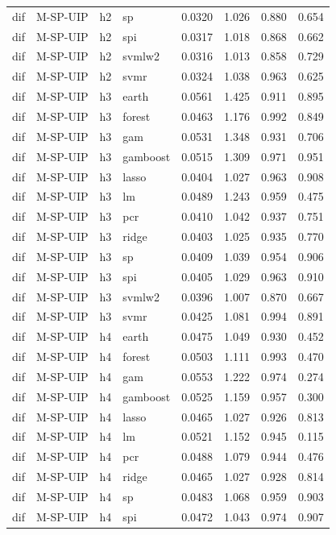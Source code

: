 \begin{ThreePartTable}
\begin{longtable}[t]{llclcccc}
dif & M-SP-UIP & h2 & sp & 0.0320 & 1.026 & 0.880 & 0.654\\
dif & M-SP-UIP & h2 & spi & 0.0317 & 1.018 & 0.868 & 0.662\\
dif & M-SP-UIP & h2 & svmlw2 & 0.0316 & 1.013 & 0.858 & 0.729\\
dif & M-SP-UIP & h2 & svmr & 0.0324 & 1.038 & 0.963 & 0.625\\
\addlinespace
dif & M-SP-UIP & h3 & earth & 0.0561 & 1.425 & 0.911 & 0.895\\
dif & M-SP-UIP & h3 & forest & 0.0463 & 1.176 & 0.992 & 0.849\\
dif & M-SP-UIP & h3 & gam & 0.0531 & 1.348 & 0.931 & 0.706\\
dif & M-SP-UIP & h3 & gamboost & 0.0515 & 1.309 & 0.971 & 0.951\\
dif & M-SP-UIP & h3 & lasso & 0.0404 & 1.027 & 0.963 & 0.908\\
dif & M-SP-UIP & h3 & lm & 0.0489 & 1.243 & 0.959 & 0.475\\
dif & M-SP-UIP & h3 & pcr & 0.0410 & 1.042 & 0.937 & 0.751\\
dif & M-SP-UIP & h3 & ridge & 0.0403 & 1.025 & 0.935 & 0.770\\
dif & M-SP-UIP & h3 & sp & 0.0409 & 1.039 & 0.954 & 0.906\\
dif & M-SP-UIP & h3 & spi & 0.0405 & 1.029 & 0.963 & 0.910\\
dif & M-SP-UIP & h3 & svmlw2 & 0.0396 & 1.007 & 0.870 & 0.667\\
dif & M-SP-UIP & h3 & svmr & 0.0425 & 1.081 & 0.994 & 0.891\\
\addlinespace
dif & M-SP-UIP & h4 & earth & 0.0475 & 1.049 & 0.930 & 0.452\\
dif & M-SP-UIP & h4 & forest & 0.0503 & 1.111 & 0.993 & 0.470\\
dif & M-SP-UIP & h4 & gam & 0.0553 & 1.222 & 0.974 & 0.274\\
dif & M-SP-UIP & h4 & gamboost & 0.0525 & 1.159 & 0.957 & 0.300\\
dif & M-SP-UIP & h4 & lasso & 0.0465 & 1.027 & 0.926 & 0.813\\
dif & M-SP-UIP & h4 & lm & 0.0521 & 1.152 & 0.945 & 0.115\\
dif & M-SP-UIP & h4 & pcr & 0.0488 & 1.079 & 0.944 & 0.476\\
dif & M-SP-UIP & h4 & ridge & 0.0465 & 1.027 & 0.928 & 0.814\\
dif & M-SP-UIP & h4 & sp & 0.0483 & 1.068 & 0.959 & 0.903\\
dif & M-SP-UIP & h4 & spi & 0.0472 & 1.043 & 0.974 & 0.907\\

\end{longtable}
\end{ThreePartTable}
